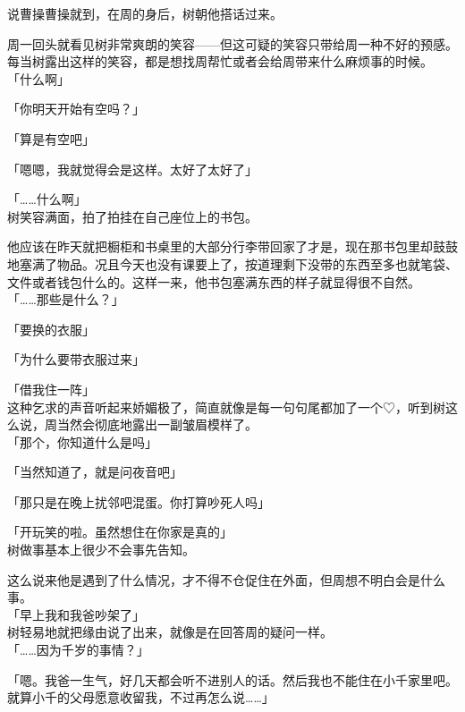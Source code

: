 说曹操曹操就到，在周的身后，树朝他搭话过来。

周一回头就看见树非常爽朗的笑容——但这可疑的笑容只带给周一种不好的预感。每当树露出这样的笑容，都是想找周帮忙或者会给周带来什么麻烦事的时候。\\

「什么啊」

「你明天开始有空吗？」

「算是有空吧」

「嗯嗯，我就觉得会是这样。太好了太好了」

「……什么啊」\\

树笑容满面，拍了拍挂在自己座位上的书包。

他应该在昨天就把橱柜和书桌里的大部分行李带回家了才是，现在那书包里却鼓鼓地塞满了物品。况且今天也没有课要上了，按道理剩下没带的东西至多也就笔袋、文件或者钱包什么的。这样一来，他书包塞满东西的样子就显得很不自然。\\

「……那些是什么？」

「要换的衣服」

「为什么要带衣服过来」

「借我住一阵」\\

这种乞求的声音听起来娇媚极了，简直就像是每一句句尾都加了一个♡，听到树这么说，周当然会彻底地露出一副皱眉模样了。\\%

「那个，你知道什么是吗」

「当然知道了，就是问夜音吧」

「那只是在晚上扰邻吧混蛋。你打算吵死人吗」

「开玩笑的啦。虽然想住在你家是真的」\\

树做事基本上很少不会事先告知。

这么说来他是遇到了什么情况，才不得不仓促住在外面，但周想不明白会是什么事。\\

「早上我和我爸吵架了」\\

树轻易地就把缘由说了出来，就像是在回答周的疑问一样。\\

「……因为千岁的事情？」

「嗯。我爸一生气，好几天都会听不进别人的话。然后我也不能住在小千家里吧。就算小千的父母愿意收留我，不过再怎么说……」

